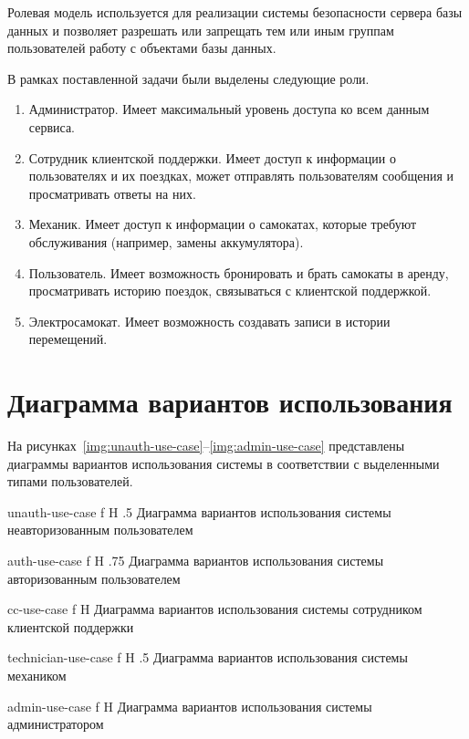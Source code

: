 Ролевая модель используется для реализации системы безопасности сервера базы данных и позволяет разрешать или запрещать тем или иным группам пользователей работу с объектами базы данных.

В рамках поставленной задачи были выделены следующие роли.

\begin{enumerate}
    \item Администратор. Имеет максимальный уровень доступа ко всем данным сервиса.
    \item Сотрудник клиентской поддержки. Имеет доступ к информации о пользователях и их поездках, может отправлять пользователям сообщения и просматривать ответы на них.
    \item Механик. Имеет доступ к информации о самокатах, которые требуют обслуживания (например, замены аккумулятора).
    \item Пользователь. Имеет возможность бронировать и брать самокаты в аренду, просматривать историю поездок, связываться с клиентской поддержкой.
    \item Электросамокат. Имеет возможность создавать записи в истории перемещений.
\end{enumerate}

\section{Диаграмма вариантов использования}

На рисунках~\ref{img:unauth-use-case}--\ref{img:admin-use-case} представлены диаграммы вариантов использования системы в соответствии с выделенными типами пользователей.

    {unauth-use-case}
    {f}
    {H}
    {.5\textwidth}
    {Диаграмма вариантов использования системы неавторизованным пользователем}

    {auth-use-case}
    {f}
    {H}
    {.75\textwidth}
    {Диаграмма вариантов использования системы авторизованным пользователем}

    {cc-use-case}
    {f}
    {H}
    {\textwidth}
    {Диаграмма вариантов использования системы сотрудником клиентской поддержки}

    {technician-use-case}
    {f}
    {H}
    {.5\textwidth}
    {Диаграмма вариантов использования системы механиком}

    {admin-use-case}
    {f}
    {H}
    {\textwidth}
    {Диаграмма вариантов использования системы администратором}

